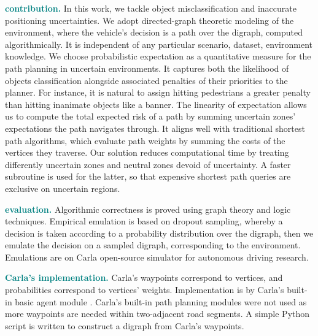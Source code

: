 \textcolor{teal}{\textbf{contribution.}} In this work, we tackle object misclassification and inaccurate positioning uncertainties. We adopt directed-graph theoretic modeling of the environment, where the vehicle's decision is a path over the digraph, computed algorithmically. It is independent of any particular scenario, dataset, environment knowledge. We choose probabilistic expectation as a quantitative measure for the path planning in uncertain environments. It captures both the likelihood of objects classification alongside associated penalties of their priorities to the planner. For instance, it is natural to assign hitting pedestrians a greater penalty than hitting inanimate objects like a banner. The linearity of expectation allows us to compute the total expected risk of a path by summing uncertain zones' expectations the path navigates through. It aligns well with traditional shortest path algorithms, which evaluate path weights by summing the costs of the vertices they traverse. Our solution reduces computational time by treating differently uncertain zones and neutral zones devoid of uncertainty. A faster subroutine is used for the latter, so that expensive shortest path queries are exclusive on uncertain regions.

\textcolor{teal}{\textbf{evaluation.}} Algorithmic correctness is proved using graph theory and logic techniques. Empirical emulation is based on dropout sampling, whereby a decision is taken according to a probability distribution over the digraph, then we emulate the decision on a sampled digraph, corresponding to the environment. Emulations are on Carla open-source simulator for autonomous driving research.

\textcolor{teal}{\textbf{Carla's implementation.}} Carla's waypoints correspond to vertices, and probabilities correspond to vertices' weights. Implementation is by Carla's built-in basic agent module \cite{py-carla}. Carla's built-in path planning modules were not used as more waypoints are needed within two-adjacent road segments. A simple Python script is written to construct a digraph from Carla's waypoints.

